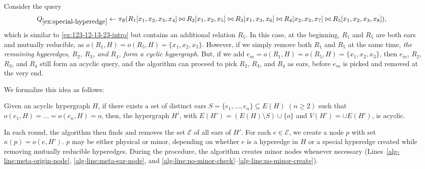 \begin{example}
    \label{ex:special-hyperedge}
    Consider the query
    \begin{align*}
        Q_{\ref{ex:special-hyperedge}} \gets \pi_{\emptyset} (& R_1[x_1, x_2, x_3, x_4] \bowtie R_2[x_1, x_2, x_5] \bowtie R_3[x_1, x_3, x_6] \bowtie R_4[x_2, x_3, x_7] \bowtie R_5[x_1, x_2, x_3, x_8]),
    \end{align*}
    which is similar to \cref{ex:123-12-13-23-intro} but contains an additional relation $R_5$. In this case, at the beginning, $R_1$ and $R_5$ are both ears and mutually reducible, as $o(R_1, H) = o(R_5, H) = \{ x_1, x_2, x_3 \}$. However, if we simply remove both $R_1$ and $R_5$ at the same time, \emph{the remaining hyperedges, $R_2$, $R_3$, and $R_4$, form a cyclic hypergraph}. But, if we add $e_m = o(R_1, H) = o(R_5, H) = \{ x_1, x_2, x_3 \}$, then $e_m$, $R_2$, $R_3$, and $R_4$ still form an acyclic query, and the algorithm can proceed to pick $R_2$, $R_3$, and $R_4$ as ears, before $e_m$ is picked and removed at the very end.
\end{example}

We formalize this idea as follows:

\begin{proposition} \label{lem:add-back-minor}
    Given an acyclic hypergraph $H$, if there exists a set of distinct ears $S = \{ e_1, \dots, e_n \} \subseteq E(H)$ $(n \geq 2)$ such that $o(e_1, H) = \dots = o(e_n, H) = o$, then, the hypergraph $H'$, with $E(H') = (E(H) \setminus S) \cup \{ o \}$ and $V(H') = \cup E(H')$, is acyclic.
\end{proposition}


In each round, the algorithm then finds and removes the set $\mathcal{E}$ of all ears of $H'$.
For each $e \in \mathcal{E}$, we create a node $p$ with set $\kappa(p) = o(e, H')$.  
$p$ may be either physical or minor, depending on whether $e$ is a hyperedge in $H$ or a special hyperedge created while removing mutually reducible hyperedges.
During the procedure, the algorithm creates minor nodes whenever necessary (Lines~\ref{alg-line:meta-origin-node}, \ref{alg-line:meta-ear-node}, and \ref{alg-line:no-minor-check}--\ref{alg-line:no-minor-create}).

